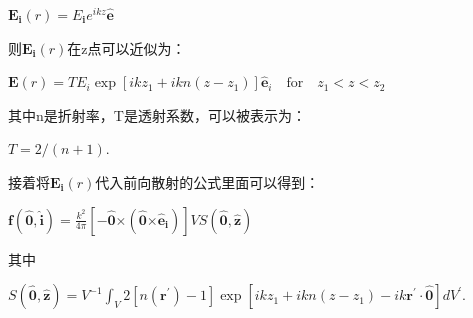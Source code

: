 \documentclass[12pt, a4paper, oneside]{ctexart}
\begin{document}
\begin{spacing}{2.0}
\begin{center}
    $\mathbf{E}_\mathbf{i}(r)=E_\mathbf{i}e^{ikz}\mathbf{\hat{e}}$
\end{center}
则$\mathbf{E}_\mathbf{i}(r)$在z点可以近似为：
\begin{center}
    $\displaystyle \mathbf{E}(r)=TE_i\exp[ikz_1+ikn(z-z_1)]\mathbf{\hat{e}}_i\quad\text{for}\quad z_1<z<z_2$
\end{center}
其中n是折射率，T是透射系数，可以被表示为：
\begin{center}
    $\displaystyle T=2/(n+1).$
\end{center}
接着将$\mathbf{E}_\mathbf{i}(r)$代入前向散射的公式里面可以得到：
\begin{center}
    $\displaystyle \mathbf{f}(\mathbf{\hat{0}},\mathbf{\hat{i}})=\frac{k^2}{4\pi}[-\mathbf{\hat{0}}\mathbf{\times}(\mathbf{\hat{0}}\mathbf{\times}\mathbf{\hat{e}_i})]VS(\mathbf{\hat{0}},\mathbf{\hat{z}})$
\end{center}
其中
\begin{center}
    $\displaystyle S(\mathbf{\hat{0}},\mathbf{\hat{z}})=V^{-1}\int_{V}2[n(\mathbf{r}^{\prime})-1]\exp[i k z_{1}+i k n(z-z_{1})-i k\mathbf{r}^{\prime}\cdot\mathbf{\hat{0}}]d V^{\prime}.$
\end{center}


\end{spacing}
\end{document}

